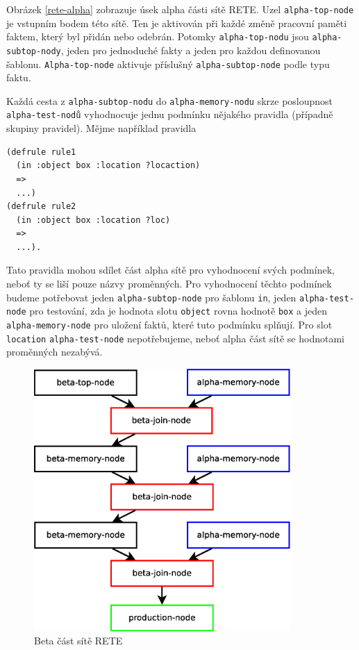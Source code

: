 Obrázek \ref{rete-alpha} zobrazuje úsek alpha části sítě RETE. Uzel
\verb|alpha-top-node| je vstupním bodem této sítě. Ten je aktivován při každé
změně pracovní paměti faktem, který byl přidán nebo odebrán. Potomky
\verb|alpha-top-nodu| jsou \verb|alpha-subtop-nody|, jeden pro jednoduché fakty
a jeden pro každou definovanou šablonu. \verb|Alpha-top-node| aktivuje příslušný
\verb|alpha-subtop-node| podle typu faktu.

Každá cesta z \verb|alpha-subtop-nodu| do \verb|alpha-memory-nodu| skrze
posloupnost \verb|alpha-test-nodů| vyhodnocuje jednu podmínku nějakého pravidla
(případně skupiny pravidel). Mějme například pravidla
\begin{verbatim}
(defrule rule1
  (in :object box :location ?locaction)
  =>
  ...)
(defrule rule2
  (in :object box :location ?loc)
  =>
  ...).
\end{verbatim}
Tato pravidla mohou sdílet část alpha sítě pro vyhodnocení svých podmínek, neboť
ty se liší pouze názvy proměnných. Pro vyhodnocení těchto podmínek budeme
potřebovat jeden \verb|alpha-subtop-node| pro šablonu \verb|in|, jeden
\verb|alpha-test-node| pro testování, zda je hodnota slotu \verb|object| rovna
hodnotě \verb|box| a jeden \verb|alpha-memory-node| pro uložení faktů, které
tuto podmínku splňují. Pro slot \verb|location| \verb|alpha-test-node|
nepotřebujeme, neboť alpha část sítě se hodnotami proměnných nezabývá.

\begin{figure}[h]
\centering
\includegraphics[height=10cm]{rete-beta.eps}
\caption{Beta část sítě RETE}
\label{rete-beta}
\end{figure}

